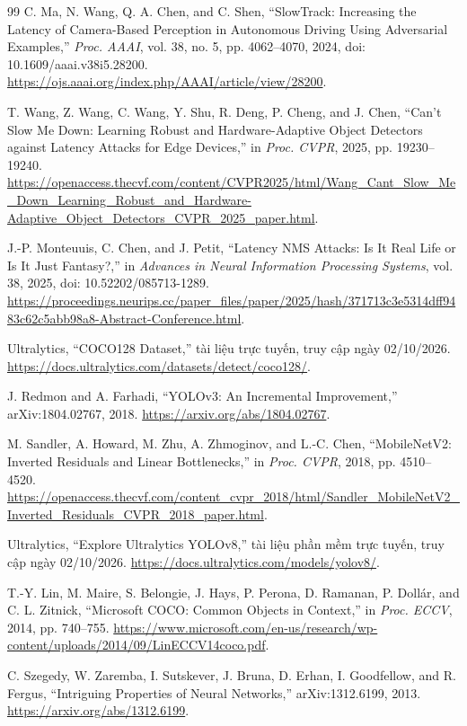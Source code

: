 \documentclass[a4paper,fleqn]{cas-dc}
\begin{document}
\begin{thebibliography}{99}
C. Ma, N. Wang, Q. A. Chen, and C. Shen,
``SlowTrack: Increasing the Latency of Camera-Based Perception in Autonomous Driving Using Adversarial Examples,'' \emph{Proc. AAAI}, vol. 38, no. 5, pp. 4062--4070, 2024, doi: 10.1609/aaai.v38i5.28200. \url{https://ojs.aaai.org/index.php/AAAI/article/view/28200}.

T. Wang, Z. Wang, C. Wang, Y. Shu, R. Deng, P. Cheng, and J. Chen,
``Can't Slow Me Down: Learning Robust and Hardware-Adaptive Object Detectors against Latency Attacks for Edge Devices,'' in \emph{Proc. CVPR}, 2025, pp. 19230--19240. \url{https://openaccess.thecvf.com/content/CVPR2025/html/Wang_Cant_Slow_Me_Down_Learning_Robust_and_Hardware-Adaptive_Object_Detectors_CVPR_2025_paper.html}.

J.-P. Monteuuis, C. Chen, and J. Petit,
``Latency NMS Attacks: Is It Real Life or Is It Just Fantasy?,'' in \emph{Advances in Neural Information Processing Systems}, vol. 38, 2025, doi: 10.52202/085713-1289. \url{https://proceedings.neurips.cc/paper_files/paper/2025/hash/371713c3e5314dff9483c62c5abb98a8-Abstract-Conference.html}.

Ultralytics, ``COCO128 Dataset,'' tài liệu trực tuyến, truy cập ngày 02/10/2026. \url{https://docs.ultralytics.com/datasets/detect/coco128/}.

J. Redmon and A. Farhadi, ``YOLOv3: An Incremental Improvement,'' arXiv:1804.02767, 2018. \url{https://arxiv.org/abs/1804.02767}.

M. Sandler, A. Howard, M. Zhu, A. Zhmoginov, and L.-C. Chen, ``MobileNetV2: Inverted Residuals and Linear Bottlenecks,'' in \emph{Proc. CVPR}, 2018, pp. 4510--4520. \url{https://openaccess.thecvf.com/content_cvpr_2018/html/Sandler_MobileNetV2_Inverted_Residuals_CVPR_2018_paper.html}.

Ultralytics, ``Explore Ultralytics YOLOv8,'' tài liệu phần mềm trực tuyến, truy cập ngày 02/10/2026. \url{https://docs.ultralytics.com/models/yolov8/}.

T.-Y. Lin, M. Maire, S. Belongie, J. Hays, P. Perona, D. Ramanan, P. Dollár, and C. L. Zitnick, ``Microsoft COCO: Common Objects in Context,'' in \emph{Proc. ECCV}, 2014, pp. 740--755. \url{https://www.microsoft.com/en-us/research/wp-content/uploads/2014/09/LinECCV14coco.pdf}.

C. Szegedy, W. Zaremba, I. Sutskever, J. Bruna, D. Erhan, I. Goodfellow, and R. Fergus, ``Intriguing Properties of Neural Networks,'' arXiv:1312.6199, 2013. \url{https://arxiv.org/abs/1312.6199}.


\end{thebibliography}
\end{document}
